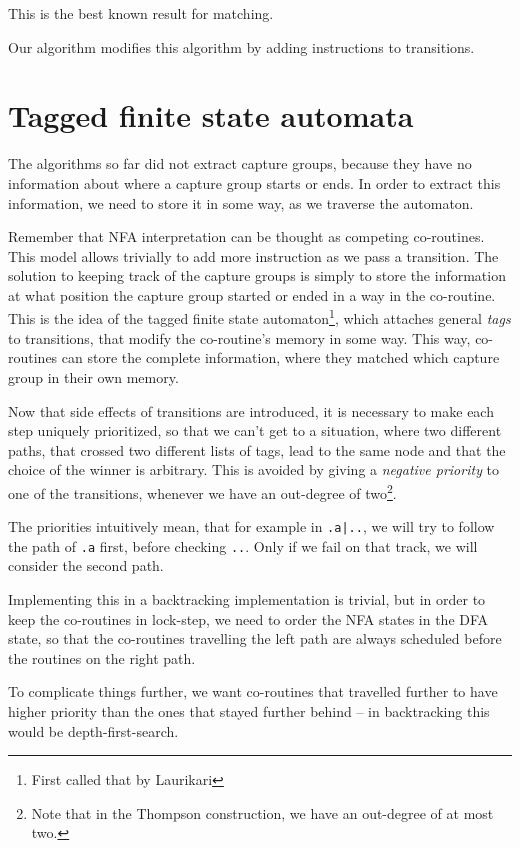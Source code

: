 \documentclass[11pt,a4paper,twoside,openright]{Thesis}
\theoremstyle{definition}
\newcommand{\seclabel}[1]{\label{sec:#1}}
\begin{document}
This is the best known result for matching\cite{Cox07a,Cox09a,Cox10a}.

Our algorithm modifies this algorithm by adding instructions to transitions.

\section{Tagged finite state automata}\seclabel{tfsa}
The algorithms so far did not extract capture groups, because they have no
information about where a capture group starts or ends. In order to extract
this information, we need to store it in some way, as we traverse the
automaton.

Remember that NFA interpretation can be thought as competing co-routines.
This model allows trivially to add more instruction as we pass a transition.
The solution to keeping track of the capture groups is simply to store the
information at what position the capture group started or ended in a way in
the co-routine. This is the idea of the tagged finite state
automaton\footnote{First called that by Laurikari\cite{Laur00a}}, which
attaches general \emph{tags} to transitions, that modify the co-routine's
memory in some way. This way, co-routines can store the complete information,
where they matched which capture group in their own memory.

Now that side effects of transitions are introduced, it is necessary to make
each step uniquely prioritized, so that we can't get to a situation, where
two different paths, that crossed two different lists of tags, lead to the
same node and that the choice of the winner is arbitrary. This is avoided by
giving a \emph{negative priority} to one of the transitions, whenever we have
an out-degree of two\footnote{Note that in the Thompson construction, we have
an out-degree of at most two.}.

The priorities intuitively mean, that for example in \texttt{.a|..}, we will
try to follow the path of \texttt{.a} first, before checking \texttt{..}.
Only if we fail on that track, we will consider the second path.

Implementing this in a backtracking implementation is trivial, but in order
to keep the co-routines in lock-step, we need to order the NFA states in the
DFA state, so that the co-routines travelling the left path are always
scheduled before the routines on the right path.

To complicate things further, we want co-routines that travelled further to 
have higher priority than the ones that stayed further behind -- in 
backtracking this would be depth-first-search.
\end{document}
